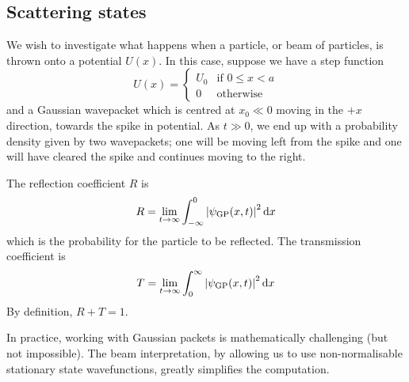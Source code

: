 \subsection{Scattering states}
We wish to investigate what happens when a particle, or beam of particles, is thrown onto a potential \( U(x) \).
In this case, suppose we have a step function
\[
	U(x) = \begin{cases} U_0 & \text{if } 0 \leq x < a \\
              0   & \text{otherwise}\end{cases}
\]
and a Gaussian wavepacket which is centred at \( x_0 \ll 0 \) moving in the \( +x \) direction, towards the spike in potential.
As \( t \gg 0 \), we end up with a probability density given by two wavepackets; one will be moving left from the spike and one will have cleared the spike and continues moving to the right.
\begin{definition}
	The reflection coefficient \( R \) is
	\[
		R = \lim_{t \to \infty} \int_{-\infty}^0 \abs{\psi_{\text{GP}}(x,t)}^2 \dd{x}
	\]
	which is the probability for the particle to be reflected.
	The transmission coefficient is
	\[
		T = \lim_{t \to \infty} \int_0^\infty \abs{\psi_{\text{GP}}(x,t)}^2 \dd{x}
	\]
	By definition, \( R + T = 1 \).
\end{definition}
In practice, working with Gaussian packets is mathematically challenging (but not impossible).
The beam interpretation, by allowing us to use non-normalisable stationary state wavefunctions, greatly simplifies the computation.

